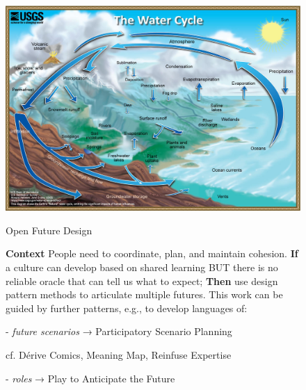 \documentclass{article}
\begin{document}
\pagestyle{empty}
\thispagestyle{empty}
\pagecolor{gray!30}

\begin{figure}[h]
\begin{adjustbox}{minipage=[c]{\textwidth-10mm},margin= 5mm 15mm 5mm 15mm, frame=1pt, bgcolor=almond,env=center}%
\begin{center}
 \includegraphics[trim=6mm 6mm 6mm 6mm,clip, width=.6\paperwidth]{image5.jpg}
\end{center}

\begin{center}
\begin{minipage}[t]{0.7\paperwidth}

\medskip
{\huge Open Future Design}
\bigskip

\Large\raggedright
\textbf{Context} People need to coordinate, plan, and maintain cohesion.\newline
\textbf{If} a culture can develop based on shared learning
BUT there is no reliable oracle that can tell us what to expect;\newline
\textbf{Then} use design pattern methods to articulate multiple
futures. This work can be guided by further patterns, e.g.,
to develop languages of:
\medskip

- \emph{future scenarios} → {\sc Participatory Scenario Planning}

\quad\quad cf. {\sc Dérive Comics}, {\sc Meaning Map}, {\sc Reinfuse Expertise} \smallskip

- \emph{roles} → {\sc Play to Anticipate the Future}


\end{minipage}
\end{center}
\end{adjustbox}
\end{figure}
\end{document}
